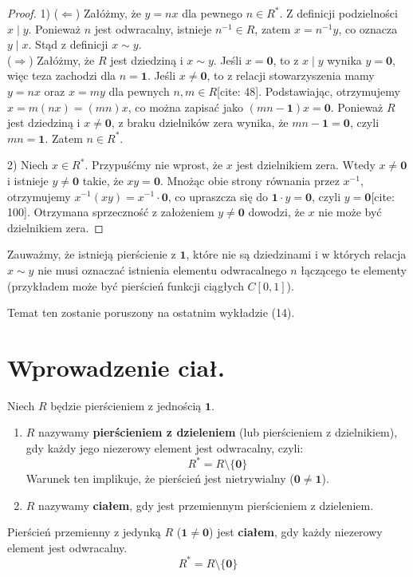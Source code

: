 \begin{proof}
    1) ($\Leftarrow$) Załóżmy, że $y = nx$ dla pewnego $n \in R^{\ast}$. Z definicji podzielności $x \mid y$. Ponieważ $n$ jest odwracalny, istnieje $n^{-1} \in R$, zatem $x = n^{-1}y$, co oznacza $y \mid x$. Stąd z definicji $x \sim y$. \\
    ($\Rightarrow$) Załóżmy, że $R$ jest dziedziną i $x \sim y$. Jeśli $x = \mathbf{0}$, to z $x \mid y$ wynika $y = \mathbf{0}$, więc teza zachodzi dla $n=\mathbf{1}$. Jeśli $x \neq \mathbf{0}$, to z relacji stowarzyszenia mamy $y = nx$ oraz $x = my$ dla pewnych $n, m \in R$[cite: 48]. Podstawiając, otrzymujemy $x = m(nx) = (mn)x$, co można zapisać jako $(mn - \mathbf{1})x = \mathbf{0}$. Ponieważ $R$ jest dziedziną i $x \neq \mathbf{0}$, z braku dzielników zera wynika, że $mn - \mathbf{1} = \mathbf{0}$, czyli $mn = \mathbf{1}$. Zatem $n \in R^{\ast}$.

    2) Niech $x \in R^{\ast}$. Przypuśćmy nie wprost, że $x$ jest dzielnikiem zera. Wtedy $x \neq \mathbf{0}$ i istnieje $y \neq \mathbf{0}$ takie, że $xy = \mathbf{0}$. Mnożąc obie strony równania przez $x^{-1}$, otrzymujemy $x^{-1}(xy) = x^{-1} \cdot \mathbf{0}$, co upraszcza się do $\mathbf{1} \cdot y = \mathbf{0}$, czyli $y = \mathbf{0}$[cite: 100]. Otrzymana sprzeczność z założeniem $y \neq \mathbf{0}$ dowodzi, że $x$ nie może być dzielnikiem zera.
\end{proof}

\begin{remark}
        Zauważmy, że istnieją pierścienie z $\mathbf{1}$, które nie są dziedzinami i w których relacja $x \sim y$ nie musi oznaczać istnienia elementu odwracalnego $n$ łączącego te elementy (przykładem może być pierścień funkcji ciągłych $C[0,1]$). 

	Temat ten zostanie poruszony na ostatnim wykładzie (14).
\end{remark}

\section{Wprowadzenie ciał.}

\begin{definition}
    Niech $R$ będzie pierścieniem z jednością $\mathbf{1}$.
    \begin{enumerate}[label=\arabic*)]
        \item $R$ nazywamy \textbf{pierścieniem z dzieleniem} (lub pierścieniem z dzielnikiem), gdy każdy jego niezerowy element jest odwracalny, czyli:
        \[ R^{\ast} = R \setminus \{\mathbf{0}\} \]
        Warunek ten implikuje, że pierścień jest nietrywialny ($\mathbf{0} \neq \mathbf{1}$).
        \item $R$ nazywamy \textbf{ciałem}, gdy jest przemiennym pierścieniem z dzieleniem.
    \end{enumerate}
\end{definition}
\begin{intuition}	
    Pierścień przemienny z jedynką $R$ ($\mathbf{1} \neq \mathbf{0}$) jest \textbf{ciałem}, gdy każdy niezerowy element jest odwracalny.
    \[ R^* = R \setminus \{ \mathbf{0} \} \]
\end{intuition} 

